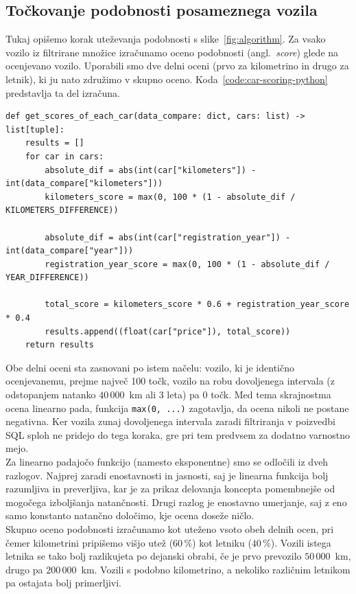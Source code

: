 \documentclass[a4paper,12pt,openright]{book}
\begin{document}
\subsection{Točkovanje podobnosti posameznega vozila}
\label{subsec:tockovanje}
Tukaj opišemo korak uteževanja podobnosti s slike~\ref{fig:algorithm}.
Za vsako vozilo iz filtrirane množice izračunamo oceno podobnosti (angl.\
\emph{score}) glede na ocenjevano vozilo. Uporabili smo dve delni oceni (prvo za
kilometrino in drugo za letnik), ki ju nato združimo v skupno oceno. Koda~\ref{code:car-scoring-python} predstavlja ta del izračuna.
\begin{center}
\label{code:car-scoring-python}
\begin{verbatim}
def get_scores_of_each_car(data_compare: dict, cars: list) -> list[tuple]:
    results = []
    for car in cars:
        absolute_dif = abs(int(car["kilometers"]) - int(data_compare["kilometers"]))
        kilometers_score = max(0, 100 * (1 - absolute_dif / KILOMETERS_DIFFERENCE))

        absolute_dif = abs(int(car["registration_year"]) - int(data_compare["year"]))
        registration_year_score = max(0, 100 * (1 - absolute_dif / YEAR_DIFFERENCE))

        total_score = kilometers_score * 0.6 + registration_year_score * 0.4
        results.append((float(car["price"]), total_score))
    return results
\end{verbatim}
\end{center}

Obe delni oceni sta zasnovani po istem načelu: vozilo, ki je identično
ocenjevanemu, prejme največ 100 točk, vozilo na robu
dovoljenega intervala (z odstopanjem natanko $40\,000$~km ali 3 leta) pa 0 točk. Med
tema skrajnostma ocena linearno pada, funkcija \texttt{max(0, ...)} zagotavlja,
da ocena nikoli ne postane negativna. Ker vozila zunaj dovoljenega intervala
zaradi filtriranja v poizvedbi SQL sploh ne pridejo do tega koraka, gre pri
tem predvsem za dodatno varnostno mejo.\\
Za linearno padajočo funkcijo (namesto eksponentne) smo se odločili
iz dveh razlogov. Najprej zaradi enostavnosti in jasnosti, saj je linearna
funkcija bolj razumljiva in preverljiva, kar je za prikaz delovanja koncepta pomembnejše od mogočega izboljšanja
natančnosti. Drugi razlog je enostavno umerjanje, saj z eno samo konstanto natančno
določimo, kje ocena doseže ničlo.\\
Skupno oceno podobnosti izračunamo kot uteženo vsoto obeh delnih ocen, pri čemer
kilometrini pripišemo višjo utež ($60\,\%$) kot letniku ($40\,\%$).
Vozili istega letnika se tako bolj razlikujeta po dejanski obrabi, če je prvo
prevozilo $50\,000$~km, drugo pa $200\,000$~km. Vozili s podobno
kilometrino, a nekoliko različnim letnikom pa ostajata bolj primerljivi.
\end{document}
